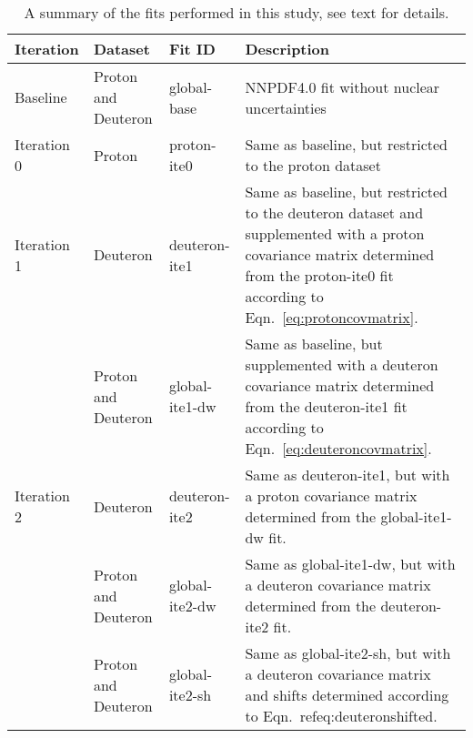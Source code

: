 \begin{table}[h]
  \centering
  \scriptsize
  \renewcommand{\arraystretch}{1.13}
  \begin{tabularx}{\textwidth}{lllX}
    \toprule
    {\bf Iteration }  & {\bf Dataset }            & {\bf Fit ID }        & { \bf Description }\\
    \midrule
    Baseline    & Proton and Deuteron & global-base    & NNPDF4.0 fit without nuclear uncertainties\\
    \midrule
    Iteration 0 & Proton              & proton-ite0    & Same as baseline, but restricted to the proton dataset\\
    \midrule
    Iteration 1 & Deuteron            & deuteron-ite1  & Same as baseline, but restricted to the deuteron dataset
                                                         and supplemented with a proton covariance matrix determined
                                                         from the proton-ite0 fit according to
                                                         Eqn.~\ref{eq:protoncovmatrix}.\\
                & Proton and Deuteron & global-ite1-dw & Same as baseline, but supplemented with a deuteron covariance
                                                         matrix determined from the deuteron-ite1 fit according to
                                                         Eqn.~\ref{eq:deuteroncovmatrix}.\\
    \midrule
    Iteration 2 & Deuteron            & deuteron-ite2  & Same as deuteron-ite1, but with a proton covariance matrix
                                                         determined from the global-ite1-dw fit.\\
                & Proton and Deuteron & global-ite2-dw & Same as global-ite1-dw, but with a deuteron covariance matrix
                                                         determined from the deuteron-ite2 fit.\\
                & Proton and Deuteron & global-ite2-sh & Same as global-ite2-sh, but with a deuteron covariance matrix
                                                         and shifts determined according to
                                                         Eqn.~ref{eq:deuteronshifted}.\\
    \bottomrule
  \end{tabularx}
  \caption{A summary of the fits performed in this study, see text for details.}
  \label{tab:fits}
\end{table}
